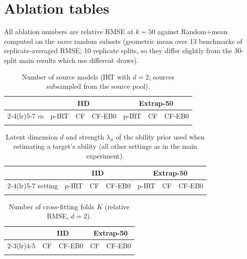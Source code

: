 \section{Ablation tables}
\label{app:abl}
All ablation numbers are relative RMSE at $k=50$ against Random+mean computed on the \emph{same} random subsets (geometric mean over 13 benchmarks of replicate-averaged RMSE; 10 replicate splits, so they differ slightly from the 30-split main results which use different draws).
\begin{table}[h]
\caption{Number of source models (IRT with $d=2$; sources subsampled from the source pool).}
\label{tab:abl_nsrc}
\centering\footnotesize
\begin{tabular}{rcccccc}
\toprule
 & \multicolumn{3}{c}{IID} & \multicolumn{3}{c}{Extrap-50}\\
\cmidrule(lr){2-4}\cmidrule(lr){5-7}
$m$ & p-IRT & CF & CF-EB0 & p-IRT & CF & CF-EB0\\
\midrule
\\
\bottomrule
\end{tabular}
\end{table}
\begin{table}[h]
\caption{Latent dimension $d$ and strength $\lambda_\vartheta$ of the ability prior used when estimating a target's ability (all other settings as in the main experiment).}
\label{tab:abl_dim}
\centering\footnotesize
\begin{tabular}{lcccccc}
\toprule
 & \multicolumn{3}{c}{IID} & \multicolumn{3}{c}{Extrap-50}\\
\cmidrule(lr){2-4}\cmidrule(lr){5-7}
setting & p-IRT & CF & CF-EB0 & p-IRT & CF & CF-EB0\\
\midrule
\\
\bottomrule
\end{tabular}
\end{table}
\begin{table}[h]
\caption{Number of cross-fitting folds $K$ (relative RMSE, $d=2$).}
\label{tab:abl_folds}
\centering\footnotesize
\begin{tabular}{lcccc}
\toprule
 & \multicolumn{2}{c}{IID} & \multicolumn{2}{c}{Extrap-50}\\
\cmidrule(lr){2-3}\cmidrule(lr){4-5}
 & CF & CF-EB0 & CF & CF-EB0\\
\midrule
\\
\bottomrule
\end{tabular}
\end{table}
